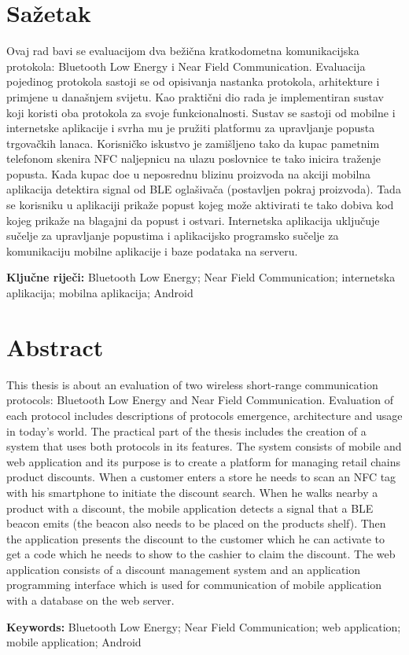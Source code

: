 \chapter*{Sa\v{z}etak}
Ovaj rad bavi se evaluacijom dva be\v{z}i\v{c}na kratkodometna komunikacijska protokola: Bluetooth Low Energy i Near Field Communication. Evaluacija pojedinog protokola sastoji se od opisivanja nastanka protokola, arhitekture i primjene u dana\v{s}njem svijetu. Kao prakti\v{c}ni dio rada je implementiran sustav koji koristi oba protokola za svoje funkcionalnosti. Sustav se sastoji od mobilne i internetske aplikacije i svrha mu je pru\v{z}iti platformu za upravljanje popusta trgova\v{c}kih lanaca. Korisni\v{c}ko iskustvo je zami\v{s}ljeno tako da kupac pametnim telefonom skenira NFC naljepnicu na ulazu poslovnice te tako inicira tra\v{z}enje popusta. Kada kupac do\dj e u neposrednu blizinu proizvoda na akciji mobilna aplikacija detektira signal od BLE ogla\v{s}iva\v{c}a (postavljen pokraj proizvoda). Tada se korisniku u aplikaciji prika\v{z}e popust kojeg mo\v{z}e aktivirati te tako dobiva kod kojeg prika\v{z}e na blagajni da popust i ostvari. Internetska aplikacija uklju\v{c}uje su\v{c}elje za upravljanje popustima i aplikacijsko programsko su\v{c}elje za komunikaciju mobilne aplikacije i baze podataka na serveru.


\vspace{1.5\baselineskip}

\noindent \textbf{Klju\v{c}ne rije\v{c}i:} Bluetooth Low Energy; Near Field Communication; internetska aplikacija; mobilna aplikacija; Android

\chapter*{Abstract}

This thesis is about an evaluation of two wireless short-range communication protocols: Bluetooth Low Energy and Near Field Communication. Evaluation of each protocol includes descriptions of protocols emergence, architecture and usage in today's world. The practical part of the thesis includes the creation of a system that uses both protocols in its features. The system consists of mobile and web application and its purpose is to create a platform for managing retail chains product discounts. When a customer enters a store he needs to scan an NFC tag with his smartphone to initiate the discount search. When he walks nearby a product with a discount, the mobile application detects a signal that a BLE beacon emits (the beacon also needs to be placed on the products shelf). Then the application presents the discount to the customer which he can activate to get a code which he needs to show to the cashier to claim the discount. The web application consists of a discount management system and an application programming interface which is used for communication of mobile application with a database on the web server.

\vspace{1.5\baselineskip}
\noindent \textbf{Keywords:} Bluetooth Low Energy; Near Field Communication; web application; mobile application; Android
